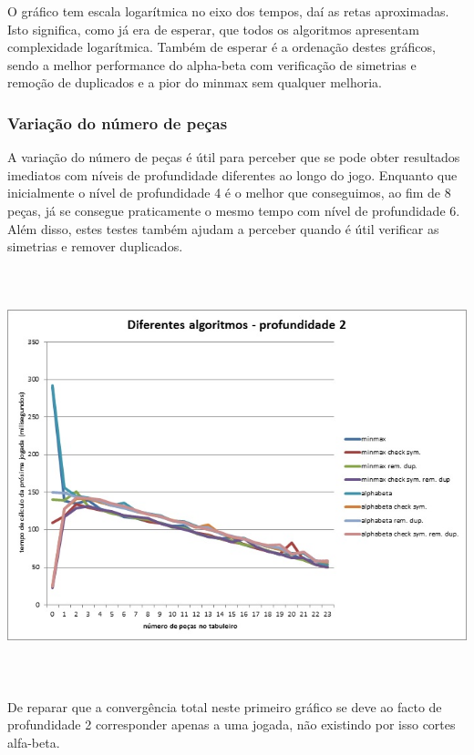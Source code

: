 O gráfico tem escala logarítmica no eixo dos tempos, daí as retas aproximadas. Isto significa, como já era de esperar, que todos os algoritmos apresentam complexidade logarítmica. Também de esperar é a ordenação destes gráficos, sendo a melhor performance do alpha-beta com verificação de simetrias e remoção de duplicados e a pior do minmax sem qualquer melhoria.

\subsubsection{Variação do número de peças}

A variação do número de peças é útil para perceber que se pode obter resultados imediatos com níveis de profundidade diferentes ao longo do jogo. Enquanto que inicialmente o nível de profundidade 4 é o melhor que conseguimos, ao fim de 8 peças, já se consegue praticamente o mesmo tempo com nível de profundidade 6. Além disso, estes testes também ajudam a perceber quando é útil verificar as simetrias e remover duplicados.

\begin{table}[H]
\centering
\includegraphics[height=12cm]{performance/tempPerfComparisonDepth2.jpg}
\end{table}

De reparar que a convergência total neste primeiro gráfico se deve ao facto de profundidade 2 corresponder apenas a uma jogada, não existindo por isso cortes alfa-beta.

